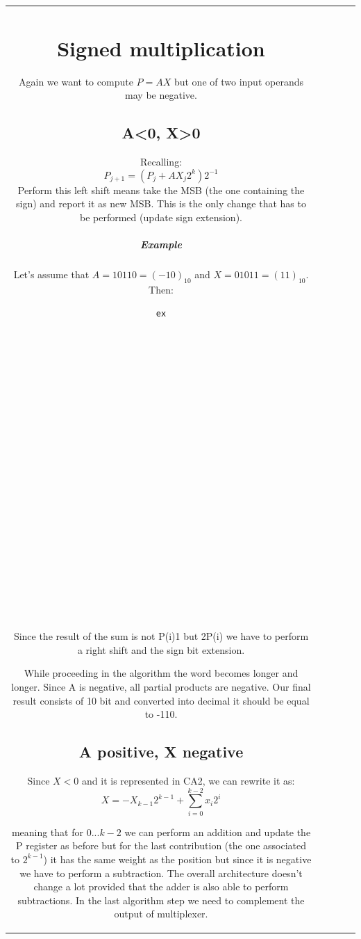 \begin{center}
\begin{tabular}{|c|c|c|c|c|}
\section{Signed multiplication}
Again we want to compute $P=AX$ but one of two input operands may be negative.

\subsection{A<0, X>0}
Recalling:
$$P_{j+1}=(P_j+A X_j 2^k)2^{-1}$$
Perform this left shift means take the MSB (the one containing the sign) and report it as new MSB. This is the only change that has to be performed (update sign extension).

\subparagraph{Example}
Let's assume that $A=10110=(-10)_{10}$ and $X=01011=(11)_{10}$. Then:

\begin{verbatim}
ex























\end{verbatim}

Since the result of the sum is not P(i)1 but 2P(i) we have to perform a right shift and the sign bit extension.

While proceeding in the algorithm the word becomes longer and longer. Since A is negative, all partial products are negative. Our final result consists of 10 bit and converted into decimal it should be equal to -110.

\subsection{A positive, X negative}
Since $X<0$ and it is represented in CA2, we can rewrite it as:
$$X=-X_{k-1}2^{k-1}+\sum_{i=0}^{k-2}x_i2^i$$

meaning that for $0...k-2$ we can perform an addition and update the P register as before but for the last contribution (the one associated to $2^{k-1}$) it has the same weight as the position but since it is negative we have to perform a subtraction. The overall architecture doesn't change a lot provided that the adder is also able to perform subtractions. In the last algorithm step we need to complement the output of multiplexer.


\end{tabular}
\end{center}
